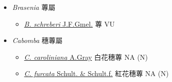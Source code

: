 
  \begin{itemize}
 \item[] \textit{Brasenia} 蓴屬
                                
  \begin{itemize}
        \item[] \href{http://www.theplantlist.org/tpl1.1/search?q=Brasenia+schreberi}{\textit{B. schreberi} J.F.Gmel.}   蓴   VU
  \end{itemize}
 \item[] \textit{Cabomba} 穗蓴屬
                                
  \begin{itemize}
        \item[] \href{http://www.theplantlist.org/tpl1.1/search?q=Cabomba+caroliniana}{\textit{C. caroliniana} A.Gray}   白花穗蓴   NA (N)
        \item[] \href{http://www.theplantlist.org/tpl1.1/search?q=Cabomba+furcata}{\textit{C. furcata} Schult. \& Schult.f.}   紅花穗蓴   NA (N)
  \end{itemize}
  \end{itemize}
